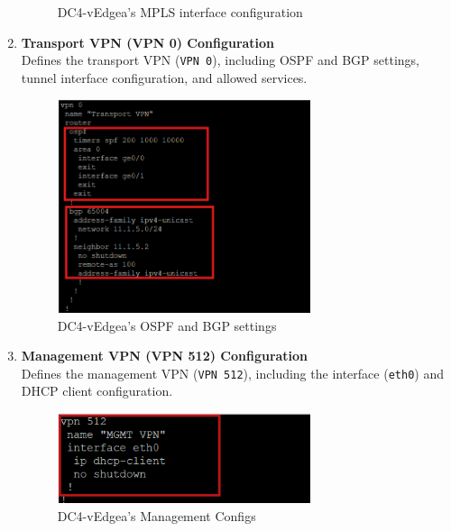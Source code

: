 \documentclass[12pt,english]{report}
\begin{document}
\begin{enumerate}
\begin{figure}[H]
    \caption{DC4-vEdgea's MPLS interface configuration}
    \label{fig: DC4 MPLS interface configuration}
\end{figure}
    \item \textbf{Transport VPN (VPN 0) Configuration} \\
    Defines the transport VPN (\texttt{VPN 0}), including OSPF and BGP settings, tunnel interface configuration, and allowed services.
\begin{figure}[H]
    \centering
    \includegraphics[width= 0.7\textwidth]{chapitre 3/4vedgea2.png}
    \caption{DC4-vEdgea's  OSPF and BGP settings}
    \label{fig: DC4-vEdgea's OSPF and BGP settings}
\end{figure}
    \item \textbf{Management VPN (VPN 512) Configuration} \\
    Defines the management VPN (\texttt{VPN 512}), including the interface (\texttt{eth0}) and DHCP client configuration.
\begin{figure}[H]
    \centering
    \includegraphics[width= 0.7\textwidth]{chapitre 3/dcvedge512.png}
    \caption{DC4-vEdgea's Management Configs}
    \label{fig: DC4-vEdgea's Management Configs}
\end{figure}
\end{enumerate}
\end{document}
